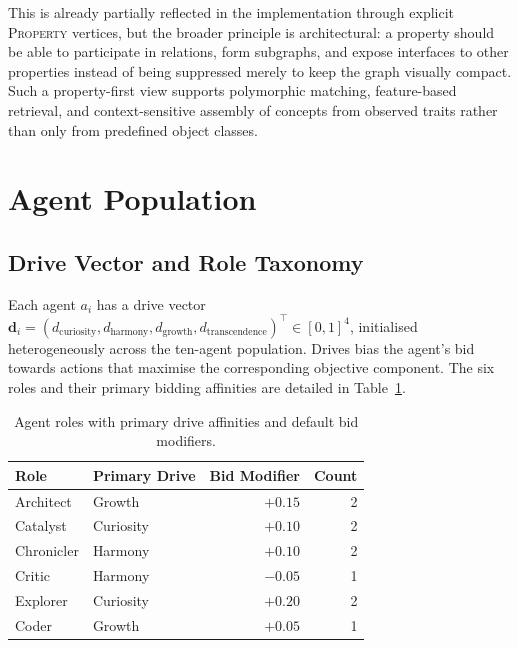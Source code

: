 \documentclass[11pt]{article}
\begin{document}
This is already partially reflected in the implementation through explicit
\textsc{Property} vertices, but the broader principle is architectural: a
property should be able to participate in relations, form subgraphs, and expose
interfaces to other properties instead of being suppressed merely to keep the
graph visually compact. Such a property-first view supports polymorphic matching,
feature-based retrieval, and context-sensitive assembly of concepts from observed
traits rather than only from predefined object classes.

\section{Agent Population}
\label{sec:agents}

\subsection{Drive Vector and Role Taxonomy}

Each agent $a_i$ has a drive vector
$\mathbf{d}_i = (d_{\text{curiosity}}, d_{\text{harmony}}, d_{\text{growth}},
d_{\text{transcendence}})^\top \in [0,1]^4$, initialised heterogeneously across
the ten-agent population. Drives bias the agent's bid towards actions that
maximise the corresponding objective component. The six roles and their primary
bidding affinities are detailed in Table~\ref{tab:roles}.

\begin{table}[H]
\centering
\caption{Agent roles with primary drive affinities and default bid modifiers.}
\label{tab:roles}
\small
\begin{tabular}{llrr}
\toprule
\textbf{Role} & \textbf{Primary Drive} & \textbf{Bid Modifier} & \textbf{Count} \\
\midrule
Architect   & Growth          & $+0.15$ & 2 \\
Catalyst    & Curiosity       & $+0.10$ & 2 \\
Chronicler  & Harmony         & $+0.10$ & 2 \\
Critic      & Harmony         & $-0.05$ & 1 \\
Explorer    & Curiosity       & $+0.20$ & 2 \\
Coder       & Growth          & $+0.05$ & 1 \\
\bottomrule
\end{tabular}
\end{table}
\end{document}
